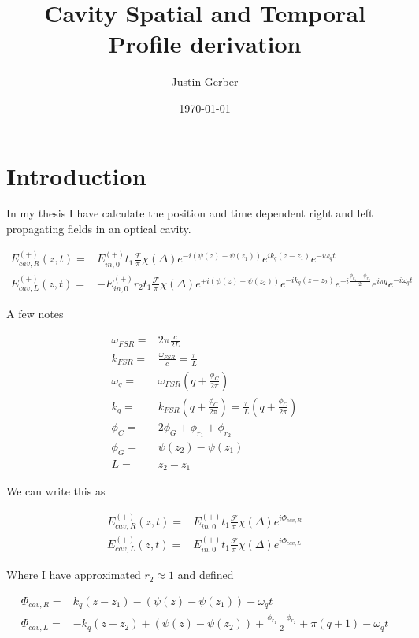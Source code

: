 \documentclass[12pt]{article}
\begin{document}
\title{Cavity Spatial and Temporal Profile derivation}
\author{Justin Gerber}
\date{\today}
\maketitle

\section{Introduction}

In my thesis I have calculate the position and time dependent right and left propagating fields in an optical cavity.

\begin{align}
E_{cav,R}^{(+)}(z,t) =& E_{in,0}^{(+)}t_1\frac{\mathcal{F}}{\pi} \chi(\Delta) e^{-i(\psi(z)-\psi(z_1))}e^{ik_q(z-z_1)}e^{-i\omega_q t}\\
E_{cav,L}^{(+)}(z,t) =& -E_{in,0}^{(+)}r_2t_1\frac{\mathcal{F}}{\pi}\chi(\Delta) e^{+i(\psi(z)-\psi(z_2))}e^{-ik_q(z-z_2)} e^{+i\frac{\phi_{r_1} - \phi_{r_2}}{2}} e^{i\pi q} e^{-i\omega_q t}
\end{align}

A few notes

\begin{align}
\omega_{FSR} =& 2\pi \frac{c}{2L}\\
k_{FSR} =& \frac{\omega_{FSR}}{c} = \frac{\pi}{L}\\
\omega_q =& \omega_{FSR}\left(q + \frac{\phi_C}{2\pi}\right)\\
k_q =& k_{FSR}\left(q+\frac{\phi_C}{2\pi}\right) = \frac{\pi}{L}\left(q+\frac{\phi_C}{2\pi}\right)\\
\phi_C =& 2\phi_G + \phi_{r_1}+\phi_{r_2}\\
\phi_G =& \psi(z_2)-\psi(z_1)\\
L =& z_2 - z_1
\end{align}

We can write this as

\begin{align}
E_{cav,R}^{(+)}(z,t) =& E_{in,0}^{(+)}t_1\frac{\mathcal{F}}{\pi}\chi(\Delta) e^{i\Phi_{cav,R}}\\
E_{cav,L}^{(+)}(z,t) =& E_{in,0}^{(+)}t_1\frac{\mathcal{F}}{\pi}\chi(\Delta) e^{i\Phi_{cav,L}}
\end{align}

Where I have approximated $r_2\approx 1$ and defined

\begin{align}
\Phi_{cav,R} =& k_q(z-z_1) - (\psi(z)-\psi(z_1)) - \omega_q t\\
\Phi_{cav,L} =& -k_q(z-z_2) + (\psi(z)-\psi(z_2)) +\frac{\phi_{r_1}-\phi_{r_2}}{2} + \pi(q + 1) - \omega_q t
\end{align}
\end{document}
